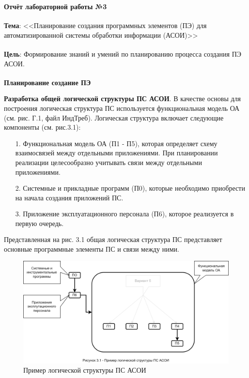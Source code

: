 \documentclass[12pt, a4paper, simple]{eskdtext}
\def \gpiDocNum {3}
\def \gpiTopicRep {Планирование создания программных элементов (ПЭ) для
автоматизированной системы обработки информации (АСОИ)}
\def \gpiDocTopic {Отчёт лабораторной работы №\gpiDocNum}
\begin{document}
    
    \thispagestyle{plain}
    \pagestyle{plain}

    \begin{center}
        \textbf{\gpiDocTopic}
    \end{center}

    \paragraph{} \textbf{Тема}: <<\gpiTopicRep>>

    \paragraph{} \textbf{Цель}:
    Формирование знаний и умений по планированию процесса создания ПЭ АСОИ.

    \paragraph{} \textbf{Планирование создание ПЭ}

    \textbf{Разработка общей логической структуры ПС АСОИ}.
    В качестве основы для построения логическая структура ПС используется функциональная модель ОА (см. рис. Г.1, файл ИндТреб).
    Логическая структура включает сле­дующие компоненты (см. рис.3.1):

    \begin{enumerate}
        \item[1.] Функциональная модель ОА (П1 - П5), которая определяет схему взаимосвязей между отдель­ными приложениями.
        При планировании реализации целесообразно учитывать связи между отдельными приложениями.
        \item[2.] Системные и прикладные программ (П0), которые необходимо приобрести на начала создания приложений ПС.
        \item[3.] Приложение эксплуатационного персонала (П6), которое реализуется в первую очередь.
    \end{enumerate}

    Представленная на рис. 3.1 общая логическая структура ПС представляет основные программные элементы ПС и связи между ними. 

    \begin{figure}[ph!]
        \centering
        \includegraphics[width=16cm]
            {_docs/Рисунок3-1ПримерЛогическойСтруктурыПСАСОИ.png}
        \caption{Пример логической структуры ПС АСОИ}
    \end{figure}
\end{document}
